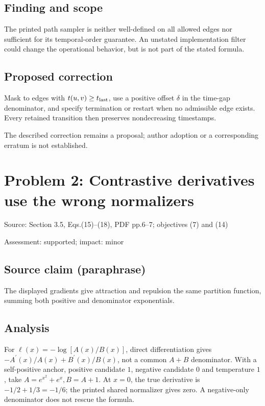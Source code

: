 \documentclass[11pt]{article}
\begin{document}
\subsection*{Finding and scope}

The printed path sampler is neither well-defined on all allowed edges nor sufficient for its temporal-order guarantee. An unstated implementation filter could change the operational behavior, but is not part of the stated formula.

\subsection*{Proposed correction}

Mask to edges with \(t(u,v)\geq t_{\rm last}\), use a positive offset \(\delta\) in the time-gap denominator, and specify termination or restart when no admissible edge exists. Every retained transition then preserves nondecreasing timestamps.

The described correction remains a proposal; author adoption or a corresponding erratum is not established.

\section*{Problem 2: Contrastive derivatives use the wrong normalizers}

Source: Section 3.5, Eqs.(15)–(18), PDF pp.6–7; objectives (7) and (14)

Assessment: supported; impact: minor

\subsection*{Source claim (paraphrase)}

The displayed gradients give attraction and repulsion the same partition function, summing both positive and denominator exponentials.

\subsection*{Analysis}

For \(\ell(x)=-\log[A(x)/B(x)]\), direct differentiation gives \(-A^{\prime}(x)/A(x)+B^{\prime}(x)/B(x)\), not a common \(A+B\) denominator. With a self-positive anchor, positive candidate \(1\), negative candidate \(0\) and temperature \(1\), take \(A=e^{x^2}+e^x,B=A+1\). At \(x=0\), the true derivative is \(-1/2+1/3=-1/6\); the printed shared normalizer gives zero. A negative-only denominator does not rescue the formula.
\end{document}
